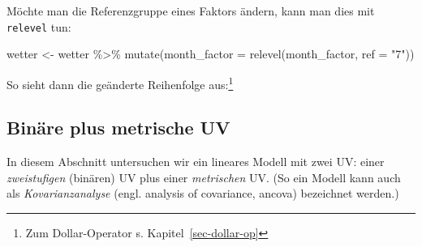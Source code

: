 \documentclass[
  letterpaper,
  oneside,
  open=any]{scrbook}
\newenvironment{Shaded}{\begin{snugshade}}{\end{snugshade}}
\newcommand{\AttributeTok}[1]{\textcolor[rgb]{0.40,0.45,0.13}{#1}}
\newcommand{\DocumentationTok}[1]{\textcolor[rgb]{0.37,0.37,0.37}{\textit{#1}}}
\newcommand{\FunctionTok}[1]{\textcolor[rgb]{0.28,0.35,0.67}{#1}}
\newcommand{\NormalTok}[1]{\textcolor[rgb]{0.00,0.23,0.31}{#1}}
\newcommand{\OtherTok}[1]{\textcolor[rgb]{0.00,0.23,0.31}{#1}}
\newcommand{\SpecialCharTok}[1]{\textcolor[rgb]{0.37,0.37,0.37}{#1}}
\newcommand{\StringTok}[1]{\textcolor[rgb]{0.13,0.47,0.30}{#1}}
\theoremstyle{definition}
\theoremstyle{definition}
\theoremstyle{definition}
\theoremstyle{remark}
\begin{document}
Möchte man die Referenzgruppe eines Faktors ändern, kann man dies mit
\texttt{relevel} tun:

\begin{Shaded}
\begin{Highlighting}[]
\NormalTok{wetter }\OtherTok{\textless{}{-}}
\NormalTok{  wetter }\SpecialCharTok{\%\textgreater{}\%} 
  \FunctionTok{mutate}\NormalTok{(}\AttributeTok{month\_factor =} \FunctionTok{relevel}\NormalTok{(month\_factor, }\AttributeTok{ref =} \StringTok{"7"}\NormalTok{))}
\end{Highlighting}
\end{Shaded}

So sieht dann die geänderte Reihenfolge aus:\footnote{Zum
  Dollar-Operator s. Kapitel~\ref{sec-dollar-op}}

\begin{Shaded}
\end{Shaded}

\subsection{Binäre plus metrische UV}\label{sec-faktorvar}

In diesem Abschnitt untersuchen wir ein lineares Modell mit zwei UV:
einer \emph{zweistufigen} (binären) UV plus einer \emph{metrischen} UV.
(So ein Modell kann auch als \emph{Kovarianzanalyse} (engl. analysis of
covariance, ancova) bezeichnet werden.)
\end{document}
